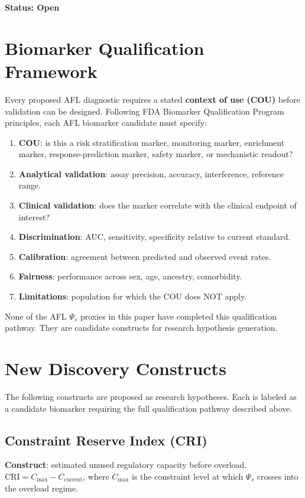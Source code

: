 \documentclass[12pt,a4paper]{article}
\begin{document}
\textbf{Status: Open}


\section{Biomarker Qualification Framework}

Every proposed AFL diagnostic requires a stated \textbf{context of use (COU)} before validation can be designed. Following FDA Biomarker Qualification Program principles, each AFL biomarker candidate must specify:
\begin{enumerate}
    \item \textbf{COU}: is this a risk stratification marker, monitoring marker, enrichment marker, response-prediction marker, safety marker, or mechanistic readout?
    \item \textbf{Analytical validation}: assay precision, accuracy, interference, reference range.
    \item \textbf{Clinical validation}: does the marker correlate with the clinical endpoint of interest?
    \item \textbf{Discrimination}: AUC, sensitivity, specificity relative to current standard.
    \item \textbf{Calibration}: agreement between predicted and observed event rates.
    \item \textbf{Fairness}: performance across sex, age, ancestry, comorbidity.
    \item \textbf{Limitations}: population for which the COU does NOT apply.
\end{enumerate}

None of the AFL $\Psi_s$ proxies in this paper have completed this qualification pathway. They are candidate constructs for research hypothesis generation.

\section{New Discovery Constructs}

The following constructs are proposed as research hypotheses. Each is labeled as a candidate biomarker requiring the full qualification pathway described above.

\subsection{Constraint Reserve Index (CRI)}

\textbf{Construct}: estimated unused regulatory capacity before overload. $\mathrm{CRI} = C_{\mathrm{max}} - C_{\mathrm{current}}$, where $C_{\mathrm{max}}$ is the constraint level at which $\Psi_s$ crosses into the overload regime.
\end{document}
